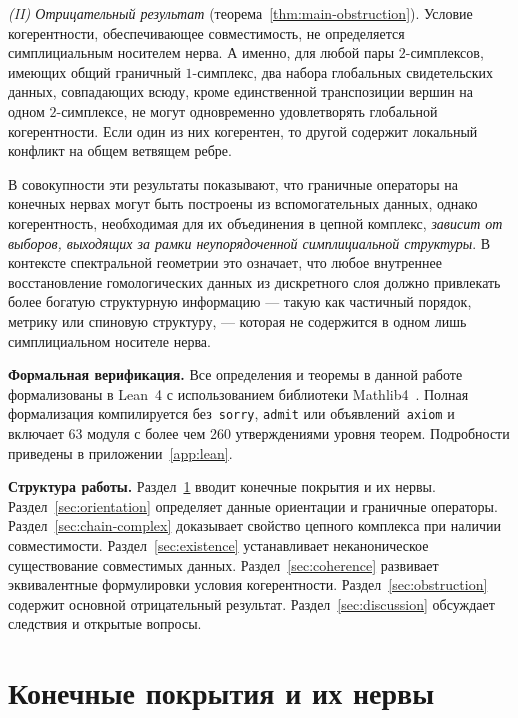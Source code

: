 \documentclass[11pt,a4paper]{article}
\theoremstyle{plain}
\theoremstyle{definition}
\theoremstyle{remark}
\begin{document}
\smallskip
\noindent\emph{(II) Отрицательный результат} (теорема~\ref{thm:main-obstruction}).
Условие когерентности, обеспечивающее совместимость, не определяется
симплициальным носителем нерва. А именно, для любой пары $2$-симплексов,
имеющих общий граничный $1$-симплекс, два набора глобальных свидетельских
данных, совпадающих всюду, кроме единственной транспозиции вершин на
одном $2$-симплексе, не могут одновременно удовлетворять глобальной
когерентности. Если один из них когерентен, то другой содержит
локальный конфликт на общем ветвящем ребре.

\smallskip
В совокупности эти результаты показывают, что граничные операторы на
конечных нервах могут быть построены из вспомогательных данных, однако
когерентность, необходимая для их объединения в цепной комплекс,
\emph{зависит от выборов, выходящих за рамки неупорядоченной
симплициальной структуры}. В контексте спектральной геометрии это означает,
что любое внутреннее восстановление гомологических данных из дискретного
слоя должно привлекать более богатую структурную информацию --- такую как
частичный порядок, метрику или спиновую структуру, --- которая не
содержится в одном лишь симплициальном носителе нерва.

\medskip

\noindent\textbf{Формальная верификация.} Все определения и теоремы
в данной работе формализованы в Lean~4 с использованием библиотеки
Mathlib4~\cite{Mathlib2024}. Полная формализация компилируется
без~\texttt{sorry}, \texttt{admit} или объявлений~\texttt{axiom}
и включает 63 модуля с более чем 260 утверждениями уровня теорем.
Подробности приведены в приложении~\ref{app:lean}.

\medskip

\noindent\textbf{Структура работы.}
Раздел~\ref{sec:nerve} вводит конечные покрытия и их нервы.
Раздел~\ref{sec:orientation} определяет данные ориентации и граничные
операторы.
Раздел~\ref{sec:chain-complex} доказывает свойство цепного комплекса
при наличии совместимости.
Раздел~\ref{sec:existence} устанавливает неканоническое существование
совместимых данных.
Раздел~\ref{sec:coherence} развивает эквивалентные формулировки условия
когерентности.
Раздел~\ref{sec:obstruction} содержит основной отрицательный результат.
Раздел~\ref{sec:discussion} обсуждает следствия и открытые вопросы.

\section{Конечные покрытия и их нервы}
\label{sec:nerve}
\end{document}

